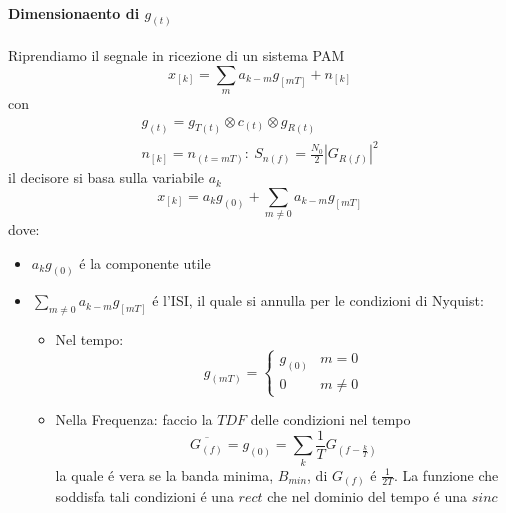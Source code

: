         \paragraph{Dimensionaento di $g_{(t)}$}
            Riprendiamo il segnale in ricezione di un sistema PAM
            \[
                x_{[k]} = \sum_{m} a_{k-m}g_{[mT]} + n_{[k]}   
            \]
            con 
            \begin{gather}
                g_{(t)} = g_{T(t)} \otimes c_{(t)} \otimes g_{R(t)}\nonumber \\
                n_{[k]} = n_{(t=mT)}:\ S_{n(f)} = \frac{N_0}{2} \left|G_{R(f)}\right|^2\nonumber
            \end{gather}
            il decisore si basa sulla variabile $a_k$
            \[
                x_{[k]} = a_{k}g_{(0)} + \sum_{m\neq 0} a_{k-m}g_{[mT]}    
            \]
            dove:
            \begin{itemize}
                \item {$a_{k}g_{(0)}$ é la componente utile}
                \item {$\sum_{m\neq 0} a_{k-m}g_{[mT]}$ é l'ISI, il quale si annulla per le condizioni di Nyquist:
                        \begin{itemize}
                            \item {Nel tempo:
                                \[
                                    g_{(mT)} = 
                                    \begin{cases}
                                        g_{(0)} &m=0\nonumber \\
                                        0 &m\neq 0\nonumber 
                                    \end{cases}  
                                \]
                            }
                            \item {Nella Frequenza: faccio la $TDF$ delle condizioni nel tempo
                                \[
                                    \overline{G_{(f)}} = g_{(0)} = \sum_{k}\frac{1}{T}G_{(f-\frac{k}{T})}    
                                \]
                                la quale é vera se la banda minima, $B_{min}$, di $G_{(f)}$ é $\frac{1}{2T}$. La 
                                funzione che soddisfa tali condizioni é una $rect$ che nel dominio del tempo é una $sinc$
                            }
                        \end{itemize}
                }
            \end{itemize}
